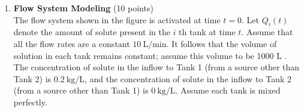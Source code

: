 \begin{enumerate}
  \newpage






  \item \textbf{Flow System Modeling} (10 points)\\
  The flow system shown in the figure is activated at time $t=0$. 
  Let $Q_i(t)$ denote the amount of solute present in the $i$ th tank at 
  time $t$. Assume that all the flow rates are a constant $10 \mathrm{~L} / \mathrm{min}$. 
  It follows that the volume of solution in each tank remains constant; 
  assume this volume to be 1000 L . The concentration of solute in the inflow to 
  Tank 1 (from a source other than Tank 2) is $0.2 \mathrm{~kg} / \mathrm{L}$, and 
  the concentration of solute in the inflow to Tank 2 (from a source other than Tank 1) 
  is $0 \mathrm{~kg} / \mathrm{L}$. Assume each tank is mixed perfectly.


\end{enumerate}
